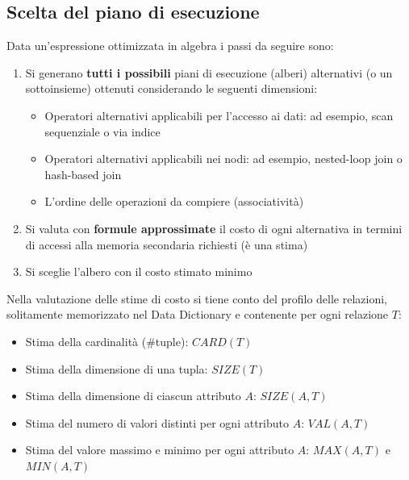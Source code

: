 \documentclass[a4paper]{article}
\begin{document}
\subsection{Scelta del piano di esecuzione}
Data un'espressione ottimizzata in algebra i passi da seguire sono:
\begin{enumerate}
  \item Si generano \textbf{tutti i possibili} piani di esecuzione (alberi) alternativi
    (o un sottoinsieme) ottenuti considerando le seguenti dimensioni:
    \begin{itemize}
      \item Operatori alternativi applicabili per l'accesso ai dati: ad esempio, scan
        sequenziale o via indice

      \item Operatori alternativi applicabili nei nodi: ad esempio, nested-loop join o
        hash-based join

      \item L'ordine delle operazioni da compiere (associatività)
    \end{itemize}

  \item Si valuta con \textbf{formule approssimate} il costo di ogni alternativa in
    termini di accessi alla memoria secondaria richiesti (è una stima)

  \item Si sceglie l'albero con il costo stimato minimo
\end{enumerate}

\vspace{1em}
\noindent
Nella valutazione delle stime di costo si tiene conto del profilo delle relazioni,
solitamente memorizzato nel Data Dictionary e contenente per ogni relazione \( T \):
\begin{itemize}
  \item Stima della cardinalità (\#tuple): \( CARD(T) \)
  \item Stima della dimensione di una tupla: \( SIZE(T) \)
  \item Stima della dimensione di ciascun attributo \( A \): \( SIZE(A,T) \)
  \item Stima del numero di valori distinti per ogni attributo \( A \): \( VAL(A,T) \)
  \item Stima del valore massimo e minimo per ogni attributo \( A \): \( MAX(A,T) \) e \( MIN(A,T) \)
\end{itemize}
\end{document}
